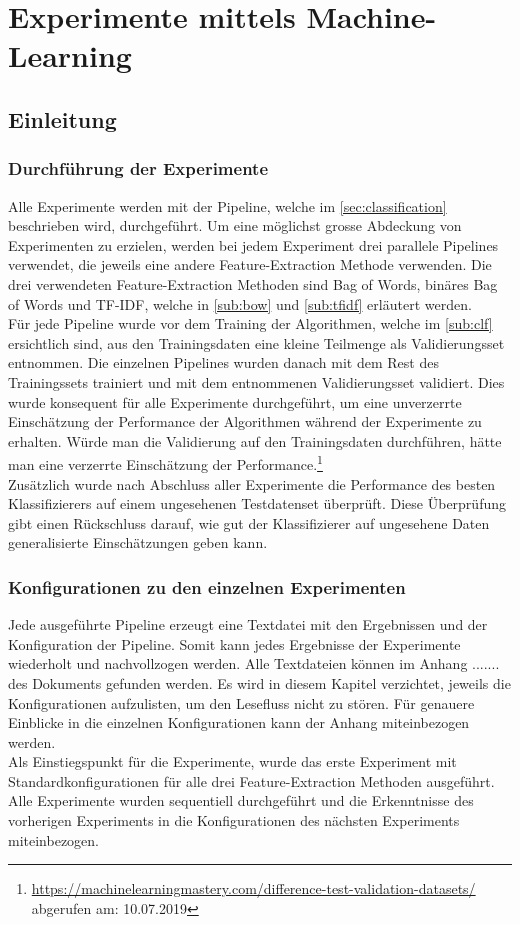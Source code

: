\section{Experimente mittels Machine-Learning}
\subsection{Einleitung}
\subsubsection{Durchführung der Experimente}
Alle Experimente werden mit der Pipeline, welche im \cref{sec:classification} beschrieben wird, durchgeführt.
Um eine möglichst grosse Abdeckung von Experimenten zu erzielen, werden bei jedem Experiment drei parallele Pipelines verwendet, die jeweils eine andere Feature-Extraction Methode verwenden.
Die drei verwendeten Feature-Extraction Methoden sind \glqq Bag of Words\grqq{}, \glqq binäres Bag of Words\grqq{} und \glqq TF-IDF\grqq{}, welche in \cref{sub:bow} und \cref{sub:tfidf} erläutert werden.\\
Für jede Pipeline wurde vor dem Training der Algorithmen, welche im \cref{sub:clf} ersichtlich sind, aus den Trainingsdaten eine kleine Teilmenge als Validierungsset entnommen.
Die einzelnen Pipelines wurden danach mit dem Rest des Trainingssets trainiert und mit dem entnommenen Validierungsset validiert.
Dies wurde konsequent für alle Experimente durchgeführt, um eine unverzerrte Einschätzung der Performance der Algorithmen während der Experimente zu erhalten.
Würde man die Validierung auf den Trainingsdaten durchführen, hätte man eine verzerrte Einschätzung der Performance.\footnote{\url{https://machinelearningmastery.com/difference-test-validation-datasets/} abgerufen am: 10.07.2019}\\
Zusätzlich wurde nach Abschluss aller Experimente die Performance des besten Klassifizierers auf einem ungesehenen Testdatenset überprüft.
Diese Überprüfung gibt einen Rückschluss darauf, wie gut der Klassifizierer auf ungesehene Daten generalisierte Einschätzungen geben kann.
\subsubsection{Konfigurationen zu den einzelnen Experimenten}
Jede ausgeführte Pipeline erzeugt eine Textdatei mit den Ergebnissen und der Konfiguration der Pipeline.
Somit kann jedes Ergebnisse der Experimente wiederholt und nachvollzogen werden.
Alle Textdateien können im Anhang ....... des Dokuments gefunden werden.
Es wird in diesem Kapitel verzichtet, jeweils die Konfigurationen aufzulisten, um den Lesefluss nicht zu stören.
Für genauere Einblicke in die einzelnen Konfigurationen kann der Anhang miteinbezogen werden.\\
Als Einstiegspunkt für die Experimente, wurde das erste Experiment mit Standardkonfigurationen für alle drei Feature-Extraction Methoden ausgeführt.\\
Alle Experimente wurden sequentiell durchgeführt und die Erkenntnisse des vorherigen Experiments in die Konfigurationen des nächsten Experiments miteinbezogen.
